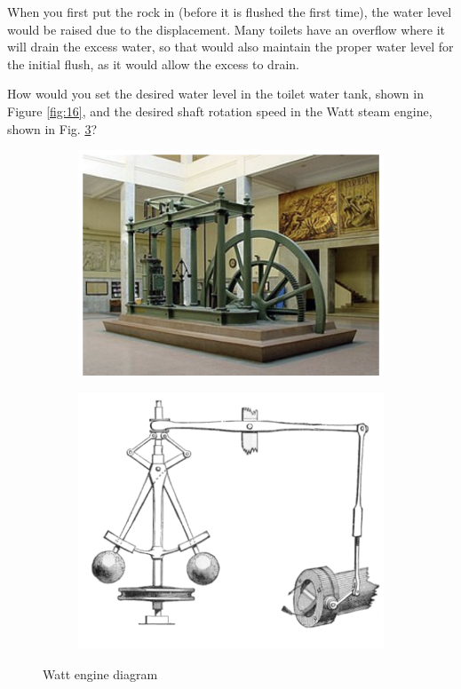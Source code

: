 \documentclass[11pt]{article}
\begin{document}
When you first put the rock in (before it is flushed the first time), the water level would be raised
due to the displacement. Many toilets have an overflow where it will drain the excess water, so that would also maintain
the proper water level for the initial flush, as it would allow the excess to drain.


How would you set the desired water level in the toilet water tank, shown in
Figure \ref{fig:16}, and the desired shaft rotation speed in the Watt steam engine, shown in Fig. \ref{fig:watt}?

\begin{figure}[h]
    \centering
    \begin{subfigure}[b]{0.45\textwidth}
        \centering
        \includegraphics[width=\textwidth]{fig17}
        \label{fig:w1}
    \end{subfigure}
    \hfill
    \begin{subfigure}[b]{0.45\textwidth}
        \centering
        \includegraphics[width=\textwidth]{fig18}
        \label{fig:w2}
    \end{subfigure}
    \caption{Watt engine diagram}
    \label{fig:watt}
\end{figure}
\end{document}
